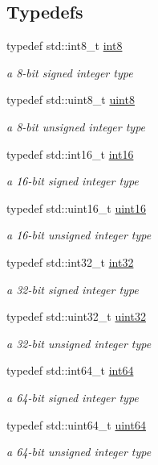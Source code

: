 \subsection*{Typedefs}
\begin{DoxyCompactItemize}
\item 
typedef std\+::int8\+\_\+t \hyperlink{namespacechaos_a557c5c30e5a935845432e60c617bd688}{int8}
\begin{DoxyCompactList}\small\item\em a 8-\/bit signed integer type \end{DoxyCompactList}\item 
typedef std\+::uint8\+\_\+t \hyperlink{namespacechaos_acbc0796d6929e3182cfd4f5c0176ab51}{uint8}
\begin{DoxyCompactList}\small\item\em a 8-\/bit unsigned integer type \end{DoxyCompactList}\item 
typedef std\+::int16\+\_\+t \hyperlink{namespacechaos_a5dd2297d965311a05d313aaba7752f55}{int16}
\begin{DoxyCompactList}\small\item\em a 16-\/bit signed integer type \end{DoxyCompactList}\item 
typedef std\+::uint16\+\_\+t \hyperlink{namespacechaos_a7957eb5f7af90c890c4b14dfd3c95c5f}{uint16}
\begin{DoxyCompactList}\small\item\em a 16-\/bit unsigned integer type \end{DoxyCompactList}\item 
typedef std\+::int32\+\_\+t \hyperlink{namespacechaos_aba819cd899114dc5873e32e7b26411c4}{int32}
\begin{DoxyCompactList}\small\item\em a 32-\/bit signed integer type \end{DoxyCompactList}\item 
typedef std\+::uint32\+\_\+t \hyperlink{namespacechaos_a8641b3ae4551f0b35570d4f9f4ec22d9}{uint32}
\begin{DoxyCompactList}\small\item\em a 32-\/bit unsigned integer type \end{DoxyCompactList}\item 
typedef std\+::int64\+\_\+t \hyperlink{namespacechaos_aa4cfe70894188e01134a2694db2eb2db}{int64}
\begin{DoxyCompactList}\small\item\em a 64-\/bit signed integer type \end{DoxyCompactList}\item 
typedef std\+::uint64\+\_\+t \hyperlink{namespacechaos_a9d62ad11fed4e3a5af70653b228ac910}{uint64}
\begin{DoxyCompactList}\small\item\em a 64-\/bit unsigned integer type \end{DoxyCompactList}\end{DoxyCompactItemize}


